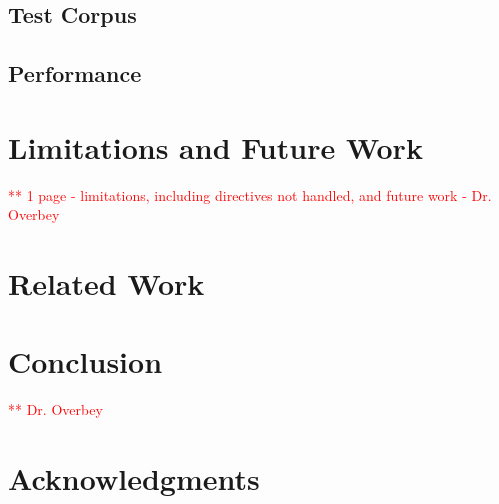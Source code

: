 \documentclass{sig-alternate-05-2015}
\newcommand\todo[1]{\textcolor{red}{** #1}}
\begin{document}
\subsection{Test Corpus}
\subsection{Performance}


\section{Limitations and Future Work}
\todo{1 page - limitations, including directives not handled, and future work - Dr. Overbey}

\section{Related Work}
\section{Conclusion}
\todo{Dr. Overbey}

\section{Acknowledgments}


%

%
%
\end{document}
